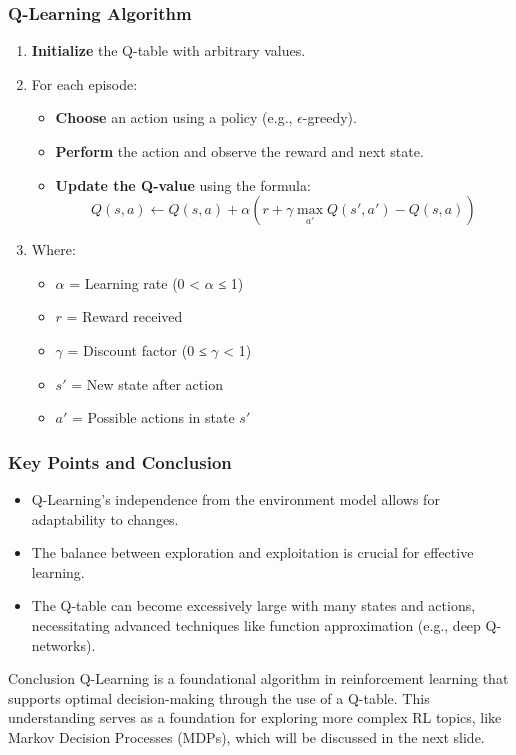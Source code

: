 \documentclass[aspectratio=169]{beamer}
\begin{document}
\begin{frame}[fragile]
    \frametitle{Q-Learning Algorithm}
    \begin{enumerate}
        \item \textbf{Initialize} the Q-table with arbitrary values.
        \item For each episode:
            \begin{itemize}
                \item \textbf{Choose} an action using a policy (e.g., $\epsilon$-greedy).
                \item \textbf{Perform} the action and observe the reward and next state.
                \item \textbf{Update the Q-value} using the formula:
                \[
                Q(s, a) \leftarrow Q(s, a) + \alpha \left( r + \gamma \max_{a'} Q(s', a') - Q(s, a) \right)
                \]
            \end{itemize}
        \item Where:
        \begin{itemize}
            \item \( \alpha \) = Learning rate (0 < \( \alpha \) ≤ 1)
            \item \( r \) = Reward received
            \item \( \gamma \) = Discount factor (0 ≤ \( \gamma \) < 1)
            \item \( s' \) = New state after action
            \item \( a' \) = Possible actions in state \( s' \)
        \end{itemize}
    \end{enumerate}
\end{frame}

\begin{frame}[fragile]
    \frametitle{Key Points and Conclusion}
    \begin{itemize}
        \item Q-Learning's independence from the environment model allows for adaptability to changes.
        \item The balance between exploration and exploitation is crucial for effective learning.
        \item The Q-table can become excessively large with many states and actions, necessitating advanced techniques like function approximation (e.g., deep Q-networks).
    \end{itemize}

    \begin{block}{Conclusion}
        Q-Learning is a foundational algorithm in reinforcement learning that supports optimal decision-making through the use of a Q-table. This understanding serves as a foundation for exploring more complex RL topics, like Markov Decision Processes (MDPs), which will be discussed in the next slide.
    \end{block}
\end{frame}
\end{document}
